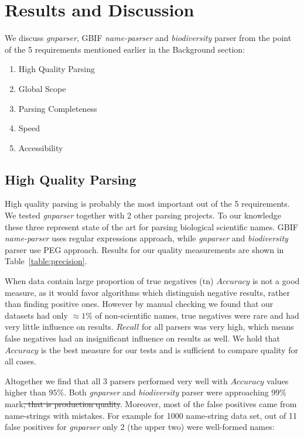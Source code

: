 \documentclass{bmcart}
\begin{document}
\section*{Results and Discussion}

We discuss \textit{gnparser}, GBIF \textit{name-pasrser} and
\textit{biodiversity} parser from the point of the 5 requirements mentioned
earlier in the Background section:

\begin{enumerate}
  \item High Quality Parsing
  \item Global Scope
  \item Parsing Completeness
  \item Speed
  \item Accessibility
\end{enumerate}

\subsection*{High Quality Parsing}

High quality parsing is probably the most important out of the 5 requirements.
We tested \textit{gnparser} together with 2 other parsing projects. To our
knowledge these three represent state of the art for parsing biological
scientific names. GBIF \textit{name-parser} uses regular expressions approach,
while \textit{gnparser} and \textit{biodiversity} parser use PEG approach.
Results for our quality measurements are shown in Table~\ref{table:precision}.

When data contain large proportion of true negatives ($\text{tn}$) $Accuracy$
is not a good measure, as it would favor algorithms which distinguish negative
results, rather than finding positive ones. However by manual checking we
found that our datasets had only $\approx1\%$ of non-scientific names, true
negatives were rare and had very little influence on results. $Recall$ for all
parsers was very high, which means false negatives had an insignificant
influence on results as well. We hold that $Accuracy$ is the best measure for
our tests and is sufficient to compare quality for all cases.

Altogether we find that all 3 parsers performed very well with $Accuracy$
values higher than $95\%$. Both \textit{gnparser} and \textit{biodiversity}
parser were approaching 99\% mark\st{, that is production
quality}. Moreover, most of
the false positives came from name-strings with mistakes. For example for 1000
name-string data set, out of 11 false positives for \textit{gnparser} only 2
(the upper two) were well-formed names:
\end{document}
